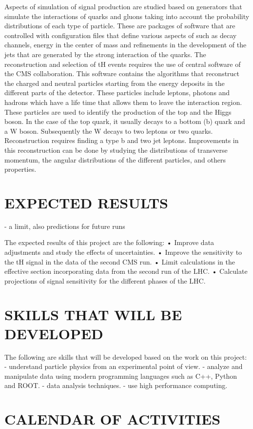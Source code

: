 \documentclass[final,3p]{CSP}
\begin{document}
Aspects of simulation of signal production are studied based on generators that simulate the interactions of quarks and gluons taking 
into account the probability distributions of each type of particle. These are packages of software that are controlled with 
configuration files that define various aspects of such as decay channels, energy in the center of mass and refinements in the 
development of the jets that are generated by the strong interaction of the quarks. The reconstruction and selection of tH events 
requires the use of central software of the CMS collaboration. This software contains the algorithms that reconstruct the charged and 
neutral particles starting from the energy deposits in the different parts of the detector. These particles include leptons, photons and 
hadrons which have a life time that allows them to leave the interaction region. These particles are used to identify the production of 
the top and the Higgs boson. In the case of the top quark, it usually decays to a bottom (b) quark and a W boson. Subsequently the W 
decays to two leptons or two quarks. Reconstruction requires finding a type b and two jet leptons. Improvements in this reconstruction 
can be done by studying the distributions of transverse momentum, the angular distributions of the different particles, and others 
properties.

\section{EXPECTED RESULTS}
- a limit, also predictions for future runs

The expected results of this project are the following:
• Improve data adjustments and study the effects of uncertainties.
• Improve the sensitivity to the tH signal in the data of the second CMS run.
• Limit calculations in the effective section incorporating data from the second
run of the LHC.
• Calculate projections of signal sensitivity for the different phases of the LHC.


\cleardoublepage



\appendix
\section{SKILLS THAT WILL BE DEVELOPED}
The following are skills that will be developed based on the work on this project:
- understand particle physics from an experimental point of view.
- analyze and manipulate data using modern programming languages such as C++, Python and ROOT.
- data analysis techniques.
- use high performance computing.

\section{CALENDAR OF ACTIVITIES}
\end{document}
